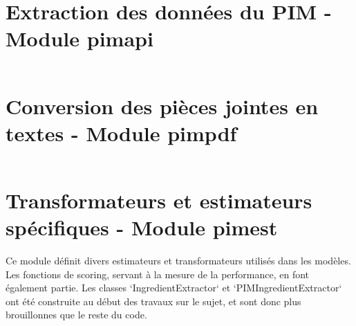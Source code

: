 \documentclass{report}
\begin{document}
    \section{Extraction des données du PIM - Module pimapi}
    \label{code:pimapi}
    \begin{multicols}{2}
    \begin{spacing}{1.0}
    \inputminted[fontsize=\tiny]{python}{../src/pimapi.py}
    \end{spacing}
    \end{multicols}

    \section{Conversion des pièces jointes en textes - Module pimpdf}
    \label{code:pimpdf}
    \begin{multicols}{2}
    \begin{spacing}{1.0}
    \inputminted[fontsize=\tiny]{python}{../src/pimpdf.py}
    \end{spacing}
    \end{multicols}
    
    \section{Transformateurs et estimateurs spécifiques - Module pimest}
    \label{code:pimest}

    Ce module définit divers estimateurs et transformateurs utilisés dans les modèles.
    Les fonctions de scoring, servant à la mesure de la performance, en font également partie.
    Les classes `IngredientExtractor` et `PIMIngredientExtractor` ont été construite au début des travaux sur le sujet, et sont donc plus \og brouillonnes \fg que le reste du code.
    
    \begin{multicols}{2}
    \begin{spacing}{1.0}
    \inputminted[fontsize=\tiny]{python}{../src/pimest.py}
    \end{spacing}
    \end{multicols}
\end{document}
